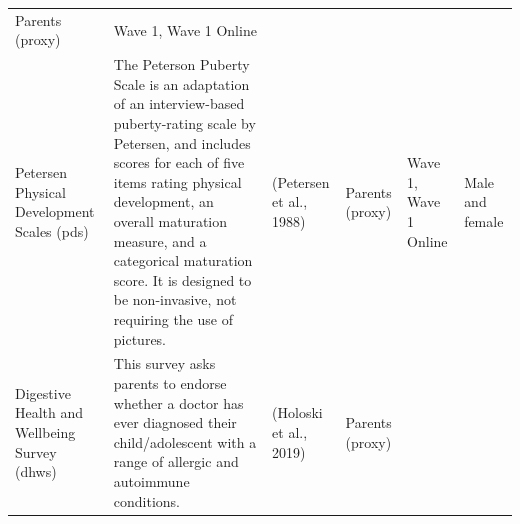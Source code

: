 \documentclass[]{book}
\begin{document}
\begin{longtable}[]{@{}llllll@{}}
\begin{minipage}[t]{0.16\columnwidth}
Parents (proxy)\strut
\end{minipage} & \begin{minipage}[t]{0.06\columnwidth}\raggedright
Wave 1, Wave 1 Online\strut
\end{minipage} & \begin{minipage}[t]{0.10\columnwidth}\raggedright
\strut
\end{minipage}\tabularnewline
\begin{minipage}[t]{0.18\columnwidth}\raggedright
Petersen Physical Development Scales (pds)\strut
\end{minipage} & \begin{minipage}[t]{0.18\columnwidth}\raggedright
The Peterson Puberty Scale is an adaptation of an interview-based puberty-rating scale by Petersen, and includes scores for each of five items rating physical development, an overall maturation measure, and a categorical maturation score. It is designed to be non-invasive, not requiring the use of pictures.\strut
\end{minipage} & \begin{minipage}[t]{0.15\columnwidth}\raggedright
(Petersen et al., 1988)\strut
\end{minipage} & \begin{minipage}[t]{0.16\columnwidth}\raggedright
Parents (proxy)\strut
\end{minipage} & \begin{minipage}[t]{0.06\columnwidth}\raggedright
Wave 1, Wave 1 Online\strut
\end{minipage} & \begin{minipage}[t]{0.10\columnwidth}\raggedright
Male and female\strut
\end{minipage}\tabularnewline
\begin{minipage}[t]{0.18\columnwidth}\raggedright
Digestive Health and Wellbeing Survey (dhws)\strut
\end{minipage} & \begin{minipage}[t]{0.18\columnwidth}\raggedright
This survey asks parents to endorse whether a doctor has ever diagnosed their child/adolescent with a range of allergic and autoimmune conditions.\strut
\end{minipage} & \begin{minipage}[t]{0.15\columnwidth}\raggedright
(Holoski et al., 2019)\strut
\end{minipage} & \begin{minipage}[t]{0.16\columnwidth}\raggedright
Parents (proxy)\strut
\end{minipage} & \begin{minipage}[t]{0.06\columnwidth}\raggedright

\end{minipage}
\end{longtable}
\end{document}
